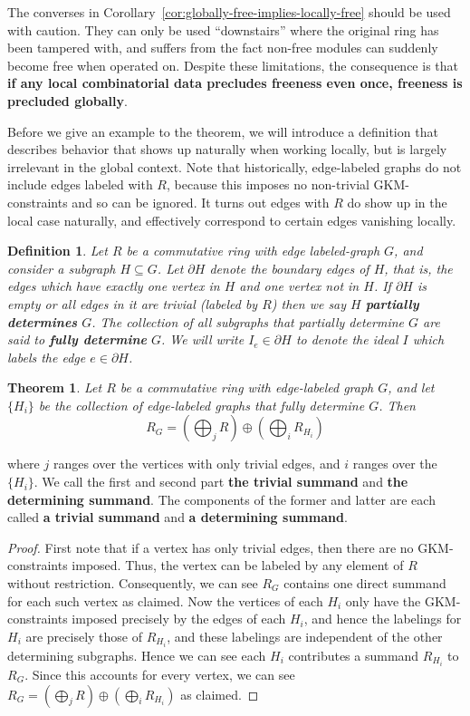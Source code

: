 \documentclass{article}
\newtheorem{definition}{Definition}
\newtheorem{theorem}{Theorem}
\begin{document}
The converses in Corollary~\ref{cor:globally-free-implies-locally-free} should be used with caution. They can only be used ``downstairs'' where the original ring has been tampered with, and suffers from the fact non-free modules can suddenly become free when operated on. Despite these limitations, the consequence is that \textbf{if any local combinatorial data precludes freeness even once, freeness is precluded globally}.




Before we give an example to the theorem, we will introduce a definition that describes behavior that shows up naturally when working locally, but is largely irrelevant in the global context. Note that historically, edge-labeled graphs do not include edges labeled with $R$, because this imposes no non-trivial GKM-constraints and so can be ignored. It turns out edges with $R$ do show up in the local case naturally, and effectively correspond to certain edges vanishing locally.

\begin{definition}
Let $R$ be a commutative ring with edge labeled-graph $G$, and consider a subgraph $H \subseteq G$. Let $\partial H$ denote the boundary edges of $H$, that is, the edges which have exactly one vertex in $H$ and one vertex not in $H$. If $\partial H$ is empty or all edges in it are trivial (labeled by $R$) then we say $H$ \textbf{partially determines} $G$. The collection of all subgraphs that partially determine $G$ are said to \textbf{fully determine} $G$. We will write $I_e \in \partial H$ to denote the ideal $I$ which labels the edge $e \in \partial H$.
\end{definition}

\begin{theorem}
\label{thm:summands}
Let $R$ be a commutative ring with edge-labeled graph $G$, and let $\{H_i\}$ be the collection of edge-labeled graphs that fully determine $G$. Then 
\[
R_G = \left(\bigoplus_j {R}\right) \oplus \left(\bigoplus_i R_{H_i}\right)
\]
\end{theorem}

where $j$ ranges over the vertices with only trivial edges, and $i$ ranges over the $\{H_i\}$. We call the first and second part \textbf{the trivial summand} and \textbf{the determining summand}. The components of the former and latter are each called \textbf{a trivial summand} and \textbf{a determining summand}.
\begin{proof}
First note that if a vertex has only trivial edges, then there are no GKM-constraints imposed. Thus, the vertex can be labeled by any element of $R$ without restriction. Consequently, we can see $R_G$ contains one direct summand for each such vertex as claimed. Now the vertices of each $H_i$ only have the GKM-constraints imposed precisely by the edges of each $H_i$, and hence the labelings for $H_i$ are precisely those of $R_{H_i}$, and these labelings are independent of the other determining subgraphs. Hence we can see each $H_i$ contributes a summand $R_{H_i}$ to $R_G$. Since this accounts for every vertex, we can see $R_G = (\bigoplus_j {R}) \oplus (\bigoplus_i R_{H_i})$ as claimed. 
\end{proof}
\end{document}
